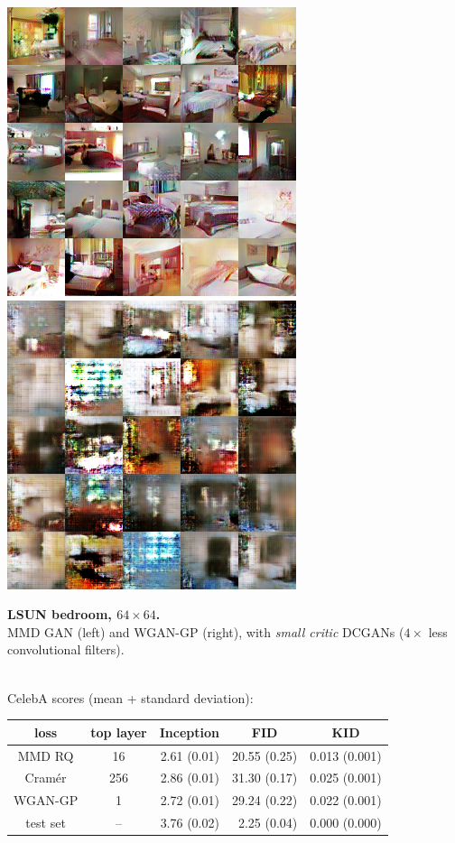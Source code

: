 \documentclass[xcolor={table}]{beamer}
\begin{document}
\begin{frame}{}
\begin{columns}[T, totalwidth=\textwidth]
\begin{column}{.32\textwidth}
    \begin{minipage}{.6\linewidth}
      \includegraphics[width=.49\linewidth]{samples/lsun_rq_16.png}
      \includegraphics[width=.49\linewidth]{samples/lsun_wgan_16.png}
    \end{minipage}
    \begin{minipage}{.39\linewidth}
       \textbf{LSUN bedroom, $64 \times 64$.}\\
       MMD GAN (left) and WGAN-GP (right),
       with \emph{small critic} DCGANs ($4\times$ less convolutional filters).
    \end{minipage}
    ~\\

    CelebA scores (mean + standard deviation):
    \begingroup \renewcommand{\arraystretch}{1.1}
    \begin{tabular}{cc|rrr}
        loss & top layer & \multicolumn{1}{c}{Inception} & \multicolumn{1}{c}{FID} & \multicolumn{1}{c}{KID} \\
        \hline
        MMD RQ   &   16 &    2.61  (0.01) &   20.55  (0.25) &   0.013  (0.001)\\
        Cram\'er &  256 &    2.86  (0.01) &   31.30  (0.17) &   0.025  (0.001)\\
        WGAN-GP  & 1    &    2.72  (0.01) &   29.24  (0.22) &   0.022  (0.001)\\
        test set & --   &    3.76  (0.02) &    2.25  (0.04) &   0.000  (0.000)\\
    \end{tabular}
    \endgroup
  \end{column}


\end{columns}
\end{frame}
\end{document}
